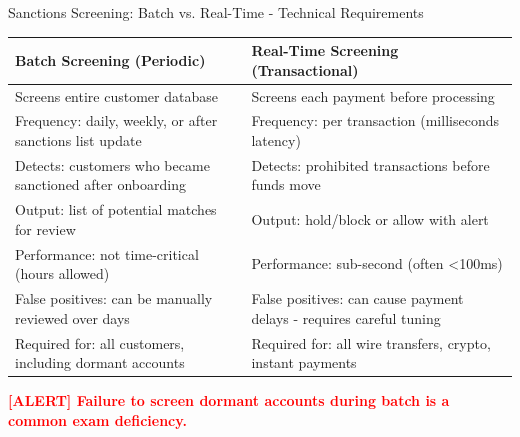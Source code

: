 \documentclass[11pt,a4paper]{beamer}
\newcommand{\redflag}[1]{\textcolor{red}{\textbf{[ALERT] #1}}}
\begin{document}
\begin{frame}{Sanctions Screening: Batch vs. Real-Time - Technical Requirements}
	\begin{tabular}{p{}|p{}}
		\hline
		\rowcolor{lightgray}
		\textbf{Batch Screening (Periodic)} & \textbf{Real-Time Screening (Transactional)} \\
		\hline
		Screens entire customer database & Screens each payment before processing \\
		\hline
		Frequency: daily, weekly, or after sanctions list update & Frequency: per transaction (milliseconds latency) \\
		\hline
		Detects: customers who became sanctioned after onboarding & Detects: prohibited transactions before funds move \\
		\hline
		Output: list of potential matches for review & Output: hold/block or allow with alert \\
		\hline
		Performance: not time-critical (hours allowed) & Performance: sub-second (often <100ms) \\
		\hline
		False positives: can be manually reviewed over days & False positives: can cause payment delays - requires careful tuning \\
		\hline
		Required for: all customers, including dormant accounts & Required for: all wire transfers, crypto, instant payments \\
		\hline
	\end{tabular}
	\redflag{Failure to screen dormant accounts during batch is a common exam deficiency.}
\end{frame}
\end{document}
